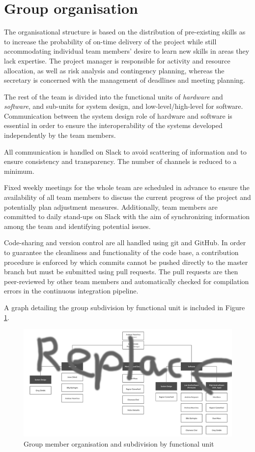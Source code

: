 \documentclass{article}
\begin{document}
\section{Group organisation}

The organisational structure is based on the distribution of pre-existing skills as to increase the probability of on-time delivery of the project while still accommodating individual team members' desire to learn new skills in areas they lack expertise. The project manager is responsible for activity and resource allocation, as well as risk analysis and contingency planning, whereas the secretary is concerned with the management of deadlines and meeting planning.

The rest of the team is divided into the functional units of \emph{hardware} and \emph{software}, and sub-units for system design, and low-level/high-level for software. Communication between the system design role of hardware and software is essential in order to ensure the interoperability of the systems developed independently by the team members.

All communication is handled on Slack to avoid scattering of information and to ensure consistency and transparency. The number of channels is reduced to a minimum.

Fixed weekly meetings for the whole team are scheduled in advance to ensure the availability of all team members to discuss the current progress of the project and potentially plan adjustment measures. Additionally, team members are committed to daily stand-ups on Slack with the aim of synchronizing information among the team and identifying potential issues.

Code-sharing and version control are all handled using git and GitHub. In order to guarantee the cleanliness and functionality of the code base, a contribution procedure is enforced by which commits cannot be pushed directly to the master branch but must be submitted using pull requests. The pull requests are then peer-reviewed by other team members and automatically checked for compilation errors in the continuous integration pipeline.

A graph detailing the group subdivision by functional unit is included in Figure \ref{fig:organisation}.

\begin{figure}[h]
\vskip 5mm
\begin{center}
\centerline{\includegraphics[width=\textwidth]{figs/organisation}}
\caption{Group member organisation and subdivision by functional unit}
\label{fig:organisation}
\end{center}
\vskip -5mm
\end{figure} 


\end{document}
